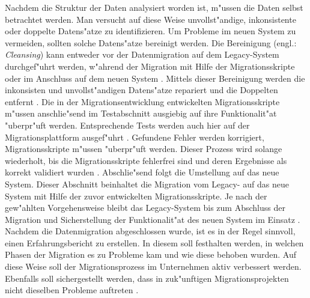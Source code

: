 \lb
Nachdem die Struktur der Daten analysiert worden ist, m"ussen die Daten selbst betrachtet werden. Man versucht auf diese Weise unvollst"andige, inkonsistente oder doppelte Datens"atze zu identifizieren. Um Probleme im neuen System zu vermeiden, sollten solche Datens"atze bereinigt werden. Die Bereinigung (engl.: \textit{ Cleansing}) kann entweder vor der Datenmigration auf dem Legacy-System durchgef"uhrt werden, w"ahrend der Migration mit Hilfe der Migrationsskripte oder im Anschluss auf dem neuen System \citep[S~7f.]{klausMatthesSchulz-2012}. Mittels dieser Bereinigung werden die inkonsisten und unvollst"andigen Datens"atze repariert und die Doppelten entfernt \citep[S.~7f.]{rahm-2010}. 
\lb
Die in der Migrationsentwicklung entwickelten Migrationsskripte m"ussen anschlie"send im Testabschnitt ausgiebig auf ihre Funktionalit"at "uberpr"uft werden. Entsprechende Tests werden auch hier auf der Migrationsplattform ausgef"uhrt \citep[S.~8f]{klausMatthesSchulz-2012}. Gefundene Fehler werden korrigiert, Migrationsskripte m"ussen "uberpr"uft werden. Dieser Prozess wird solange wiederholt, bis die Migrationsskripte fehlerfrei sind und deren Ergebnisse als korrekt validiert wurden \citep[S.~8f]{klausMatthesSchulz-2012}.
\lb
Abschlie"send folgt die Umstellung auf das neue System. Dieser Abschnitt beinhaltet die Migration vom Legacy- auf das neue System mit Hilfe der zuvor entwickelten Migrationsskripte. Je nach der gew"ahlten Vorgehensweise bleibt das Legacy-System bis zum Abschluss der Migration und Sicherstellung der Funktionalit"at des neuen System im Einsatz \citep[S.~107]{bisbal-1999}. 
\lb
Nachdem die Datenmigration abgeschlossen wurde, ist es in der Regel sinnvoll, einen Erfahrungsbericht zu erstellen. In diesem soll festhalten werden, in welchen Phasen der Migration es zu Probleme kam und wie diese behoben wurden. Auf diese Weise soll der Migrationsprozess im Unternehmen aktiv verbessert werden. Ebenfalls soll sichergestellt werden, dass in zuk"unftigen Migrationsprojekten nicht dieselben Probleme auftreten \citep[S.~10]{klausMatthesSchulz-2012}.


